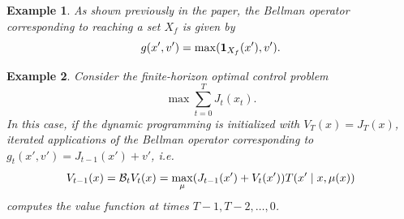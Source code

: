 \documentclass[conference]{IEEEtran}
\newtheorem{example}{Example}
\begin{document}
\begin{example}
  As shown previously in the paper, the Bellman operator corresponding to reaching a set $X_f$ is given by
  \begin{equation}
  \label{eq:bellman_reach}
    g(x', v') = \max( \ind_{X_f}(x'), v').
  \end{equation}
\end{example}

\begin{example}
  Consider the finite-horizon optimal control problem 
  \begin{equation}
     \max \sum_{t=0}^T J_t(x_t).
  \end{equation} 
  In this case, if the dynamic programming is initialized with $V_T(x) = J_T(x)$, iterated applications of the Bellman operator corresponding to $g_t(x', v') = J_{t-1}(x') + v'$, i.e.
  \begin{equation*}
    V_{t-1}(x) = \mathcal{B}_t V_{t} (x) = \max_{\mu} (J_{t-1}(x') + V_{t}(x')) T(x' \mid x, \mu(x))
  \end{equation*}
  computes the value function at times $T-1, T-2, \ldots, 0$.
\end{example}
\end{document}

